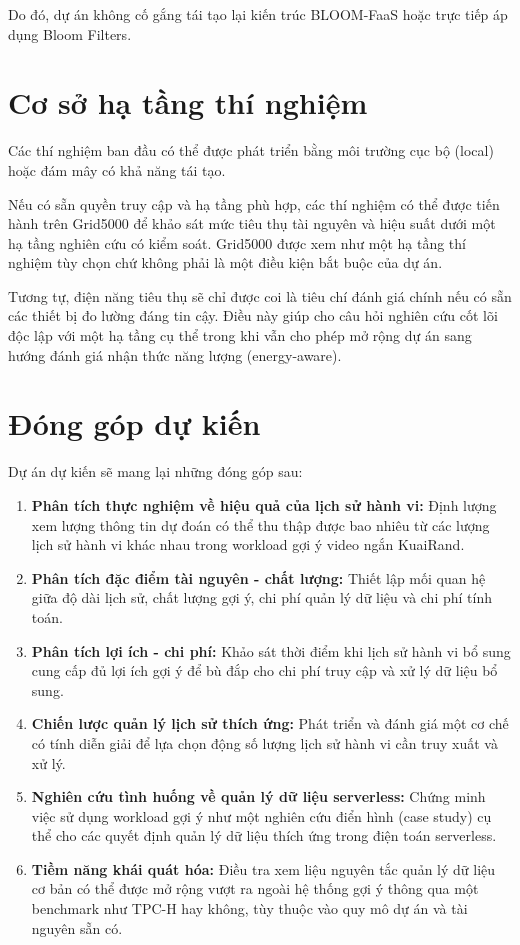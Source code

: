 \documentclass[12pt,a4paper]{article}
\begin{document}
Do đó, dự án không cố gắng tái tạo lại kiến trúc BLOOM-FaaS hoặc trực tiếp áp dụng Bloom Filters.

\section{Cơ sở hạ tầng thí nghiệm}

Các thí nghiệm ban đầu có thể được phát triển bằng môi trường cục bộ (local) hoặc đám mây có khả năng tái tạo.

Nếu có sẵn quyền truy cập và hạ tầng phù hợp, các thí nghiệm có thể được tiến hành trên Grid5000 để khảo sát mức tiêu thụ tài nguyên và hiệu suất dưới một hạ tầng nghiên cứu có kiểm soát. Grid5000 được xem như một hạ tầng thí nghiệm tùy chọn chứ không phải là một điều kiện bắt buộc của dự án.

Tương tự, điện năng tiêu thụ sẽ chỉ được coi là tiêu chí đánh giá chính nếu có sẵn các thiết bị đo lường đáng tin cậy. Điều này giúp cho câu hỏi nghiên cứu cốt lõi độc lập với một hạ tầng cụ thể trong khi vẫn cho phép mở rộng dự án sang hướng đánh giá nhận thức năng lượng (energy-aware).

\section{Đóng góp dự kiến}

Dự án dự kiến sẽ mang lại những đóng góp sau:
\begin{enumerate}
    \item \textbf{Phân tích thực nghiệm về hiệu quả của lịch sử hành vi:} Định lượng xem lượng thông tin dự đoán có thể thu thập được bao nhiêu từ các lượng lịch sử hành vi khác nhau trong workload gợi ý video ngắn KuaiRand.
    \item \textbf{Phân tích đặc điểm tài nguyên - chất lượng:} Thiết lập mối quan hệ giữa độ dài lịch sử, chất lượng gợi ý, chi phí quản lý dữ liệu và chi phí tính toán.
    \item \textbf{Phân tích lợi ích - chi phí:} Khảo sát thời điểm khi lịch sử hành vi bổ sung cung cấp đủ lợi ích gợi ý để bù đắp cho chi phí truy cập và xử lý dữ liệu bổ sung.
    \item \textbf{Chiến lược quản lý lịch sử thích ứng:} Phát triển và đánh giá một cơ chế có tính diễn giải để lựa chọn động số lượng lịch sử hành vi cần truy xuất và xử lý.
    \item \textbf{Nghiên cứu tình huống về quản lý dữ liệu serverless:} Chứng minh việc sử dụng workload gợi ý như một nghiên cứu điển hình (case study) cụ thể cho các quyết định quản lý dữ liệu thích ứng trong điện toán serverless.
    \item \textbf{Tiềm năng khái quát hóa:} Điều tra xem liệu nguyên tắc quản lý dữ liệu cơ bản có thể được mở rộng vượt ra ngoài hệ thống gợi ý thông qua một benchmark như TPC-H hay không, tùy thuộc vào quy mô dự án và tài nguyên sẵn có.
\end{enumerate}
\end{document}
